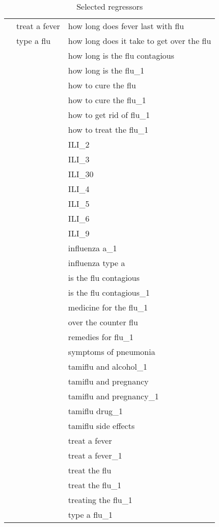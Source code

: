 \begin{table}
\begin{tabular}{l  | l  | l}
     & treat a fever & how long does fever last with flu \\
     & type a flu & how long does it take to get over the flu \\
     &       & how long is the flu contagious \\
     &       & how long is the flu_1 \\
   &       & how to cure the flu \\
     &       & how to cure the flu_1 \\
     &       & how to get rid of flu_1 \\
     &       & how to treat the flu_1 \\
     &       & ILI_2 \\
    &       & ILI_3 \\
          &       & ILI_30 \\
          &       & ILI_4 \\
          &       & ILI_5 \\
          &       & ILI_6 \\
          &       & ILI_9 \\
          &       & influenza a_1 \\
          &       & influenza type a \\
          &       & is the flu contagious \\
          &       & is the flu contagious_1 \\
          &       & medicine for the flu_1 \\
          &       & over the counter flu \\
          &       & remedies for flu_1 \\
          &       & symptoms of pneumonia \\
          &       & tamiflu and alcohol_1 \\
          &       & tamiflu and pregnancy \\
          &       & tamiflu and pregnancy_1 \\
          &       & tamiflu drug_1 \\
          &       & tamiflu side effects \\
          &       & treat a fever \\
          &       & treat a fever_1 \\
          &       & treat the flu \\
          &       & treat the flu_1 \\
          &       & treating the flu_1 \\
          &       & type a flu_1 \\

    \end{tabular}%
      \caption{Selected regressors}
  \label{tab:selectedvars}%
\end{table}%

